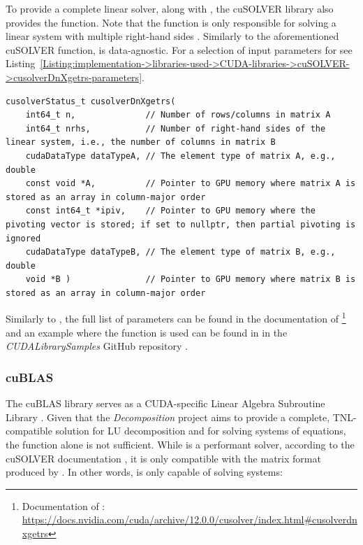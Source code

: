 To provide a complete linear solver, along with , the cuSOLVER library also provides the  function.
Note that the function is only responsible for solving a linear system with multiple right-hand sides \cite{5D33zKi5iStCty0r}.
Similarly to the aforementioned cuSOLVER function,  is data-agnostic.
For a selection of input parameters for  see Listing~\ref{Listing:implementation->libraries-used->CUDA-libraries->cuSOLVER->cusolverDnXgetrs-parameters}.

\begin{lstlisting}[caption={The function declaration of \code{cusolverDnXgetrs()} with a selection of parameters.
Note that matrix \code{A} should adhere to the format of the matrix produced by \code{cusolverDnXgetrf()} \cite{5D33zKi5iStCty0r}.},label={Listing:implementation->libraries-used->CUDA-libraries->cuSOLVER->cusolverDnXgetrs-parameters}]
cusolverStatus_t cusolverDnXgetrs(
	int64_t n,              // Number of rows/columns in matrix A
	int64_t nrhs,           // Number of right-hand sides of the linear system, i.e., the number of columns in matrix B
	cudaDataType dataTypeA, // The element type of matrix A, e.g., double
	const void *A,          // Pointer to GPU memory where matrix A is stored as an array in column-major order
	const int64_t *ipiv,    // Pointer to GPU memory where the pivoting vector is stored; if set to nullptr, then partial pivoting is ignored
	cudaDataType dataTypeB, // The element type of matrix B, e.g., double
	void *B )               // Pointer to GPU memory where matrix B is stored as an array in column-major order
\end{lstlisting}

Similarly to , the full list of parameters can be found in the documentation of \footnote{Documentation of : \url{https://docs.nvidia.com/cuda/archive/12.0.0/cusolver/index.html\#cusolverdnxgetrs}} \cite{5D33zKi5iStCty0r} and an example where the function is used can be found in  in the \textit{CUDALibrarySamples} GitHub repository \cite{Nicely2023}.

\subsubsection{cuBLAS}\label{Subsection:implementation->libraries-used->CUDA-libraries->cuBLAS}
The cuBLAS library serves as a CUDA-specific Linear Algebra Subroutine Library \cite{h9oJtLLHaTFaL3ME}.
Given that the \textit{Decomposition} project aims to provide a complete, TNL-compatible solution for LU decomposition and for solving systems of equations, the  function alone is not sufficient.
While  is a performant solver, according to the cuSOLVER documentation \cite{5D33zKi5iStCty0r}, it is only compatible with the matrix format produced by .
In other words,  is only capable of solving systems:

